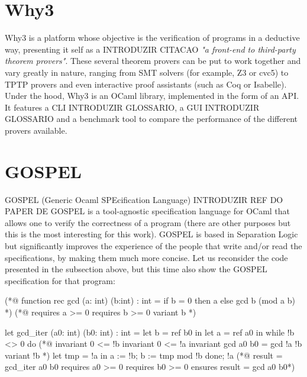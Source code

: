 {\section{Why3}
\label{sec:why3}

Why3 is a platform whose objective is the verification of programs in a deductive way, presenting it self as a INTRODUZIR CITACAO \emph{"a front-end to third-party theorem provers"}.
These several theorem provers can be put to work together and vary greatly in nature, ranging from SMT solvers (for example, Z3 or cvc5) to TPTP provers and even interactive proof assistants (such as Coq or Isabelle).
Under the hood, Why3 is an OCaml library, implemented in the form of an API.
It features a CLI INTRODUZIR GLOSSARIO, a GUI INTRODUZIR GLOSSARIO and a benchmark tool to compare the performance of the different provers available.


\section{GOSPEL}
\label{sec:gospel}

GOSPEL (Generic Ocaml SPEcification Language) INTRODUZIR REF DO PAPER DE GOSPEL is a tool-agnostic specification language for OCaml that allows one to verify the correctness of a program (there are other purposes but this is the most interesting for this work).
GOSPEL is based in Separation Logic but significantly improves the experience of the people that write and/or read the specifications, by making them much more concise.
Let us reconsider the code presented in the subsection above, but this time also show the GOSPEL specification for that program:

\begin{gospel}
  (*@ function rec gcd (a: int) (b:int) : int =
      if b = 0 then a
      else gcd b (mod a b) *)
  (*@ requires a >= 0
      requires b >= 0
      variant b *)
\end{gospel}

\begin{gospel}
  let gcd_iter (a0: int) (b0: int) : int =
    let b = ref b0 in
    let a = ref a0 in
    while !b <> 0 do
        (*@ invariant 0 <= !b
            invariant 0 <= !a
            invariant gcd a0 b0 = gcd !a !b
            variant !b *)
        let tmp = !a in
        a := !b;
        b := tmp mod !b
    done;
    !a
  (*@ result = gcd_iter a0 b0
      requires a0 >= 0
      requires b0 >= 0
      ensures result = gcd a0 b0*)
\end{gospel}

}
